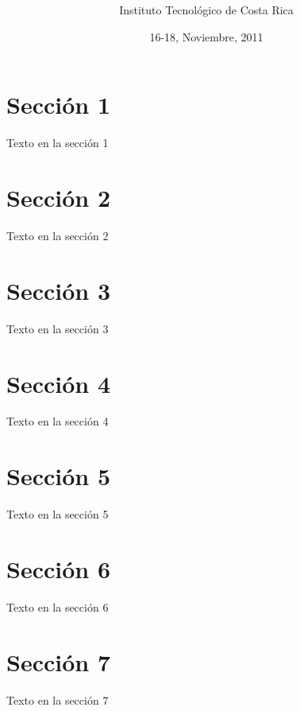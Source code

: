\documentclass[10pt, notumble, letterpaper]{leaflet}
\title{\vspace*{5cm} }
\author{Instituto Tecnológico de Costa Rica}
\date{16-18, Noviembre, 2011 }
\begin{document}
\maketitle

\thispagestyle{empty}

\section{Sección 1}

Texto en la sección 1

\newpage

\section{Sección 2}

Texto en la sección 2

\newpage

\section{Sección 3}

Texto en la sección 3

\newpage

\section{Sección 4}

Texto en la sección 4

\newpage

\section{Sección 5}

Texto en la sección 5

\newpage

\section{Sección 6}

Texto en la sección 6

\section{Sección 7}

Texto en la sección 7
\end{document}

